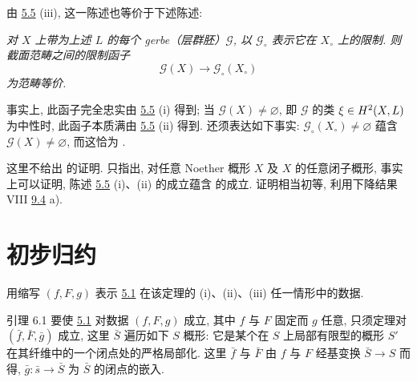 由 \hyperref[XII.cor5.5]{5.5} (iii), 这一陈述也等价于下述陈述:

\emph{对 $X$ 上带为上述 $L$ 的每个 gerbe（层群胚）$\mathcal G$, 以 $\mathcal G_{\circ}$ 表示它在 $X_{\circ}$ 上的限制. 则截面范畴之间的限制函子}
$$
\mathcal G(X)\longrightarrow\mathcal G_{\circ}(X_{\circ})
$$
\emph{为范畴等价.}


事实上, 此函子完全忠实由 \hyperref[XII.cor5.5]{5.5} (i) 得到; 当 $\mathcal G(X)\neq\varnothing$, 即 $\mathcal G$ 的类 $\xi\in H^2(X,\sisi{\mathcal G}{L})$ 为中性时, 此函子本质满由 \hyperref[XII.cor5.5]{5.5} (ii) 得到. 还须表达如下事实: $\mathcal G_{\circ}(X_{\circ})\neq\varnothing$ 蕴含 $\mathcal G(X)\neq\varnothing$, 而这恰为 .

这里不给出  的证明. 只指出, 对任意 Noether 概形 $X$ 及 $X$ 的任意闭子概形, 事实上可以证明, 陈述 \hyperref[XII.cor5.5]{5.5} (i)、(ii) 的成立蕴含  的成立. 证明相当初等, 利用下降结果 VIII \hyperref[VIII.thm9.4]{9.4} a).

\section{初步归约}

用缩写 $(f,F,g)$ 表示 \hyperref[XII.thm5.1]{5.1} 在该定理的 (i)、(ii)、(iii) 任一情形中的数据.

\begin{enonce*}{引理 6.1}
要使 \hyperref[XII.thm5.1]{5.1} 对数据 $(f,F,g)$ 成立, 其中 $f$ 与 $F$ 固定而 $g$ 任意, 只须定理对 $(\bar f,\bar F,\bar g)$ 成立, 这里 $\bar S$ 遍历如下 $S$ 概形: 它是某个在 $S$ 上局部\pageoriginale 有限型的概形 $S'$ 在其纤维中的一个闭点处的严格局部化. 这里 $\bar f$ 与 $\bar F$ 由 $f$ 与 $F$ 经基变换 $\bar S\to S$ 而得, $\bar g:\bar s\to\bar S$ 为 $\bar S$ 的闭点的嵌入.
\end{enonce*}

